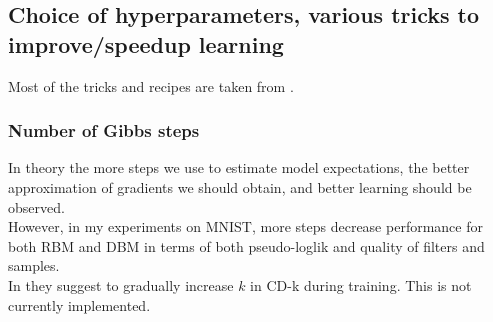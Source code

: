 \subsection{Choice of hyperparameters, various tricks to improve/speedup learning}
Most of the tricks and recipes are taken from \cite{hinton2010practical}.

\subsubsection{Number of Gibbs steps}
In theory the more steps we use to estimate model expectations, the better approximation of gradients we should obtain, and better learning should be observed.
\\[0.5em]
\bad However, in my experiments on MNIST, more steps decrease performance for both RBM and DBM in terms of both pseudo-loglik and quality of filters and samples.
\\
\textbullet{} In \cite{hinton2010practical} they suggest to gradually increase $k$ in CD-k during training. This is not currently implemented.

